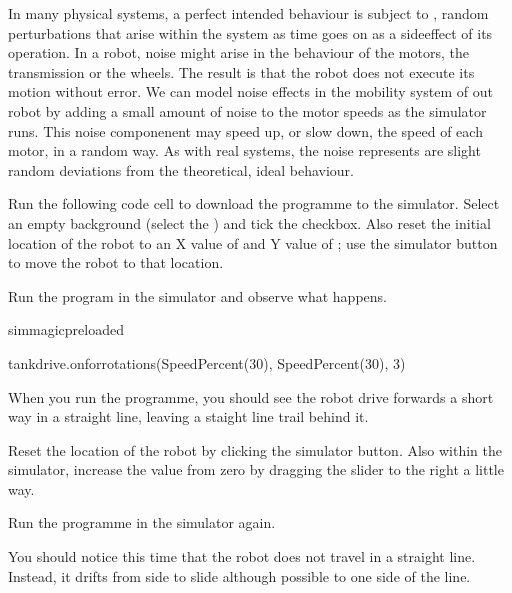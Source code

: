 \documentclass[letterpaper,10pt,english]{sphinxmanual}
\begin{document}
{In many physical systems, a perfect intended behaviour is subject to , random perturbations that arise within the system as time goes on as a side\sphinxhyphen{}effect of its operation. In a robot, noise might arise in the behaviour of the motors, the transmission or the wheels. The result is that the robot does not execute its motion without error. We can model noise effects in the mobility system of out robot by adding a small amount of noise to the motor speeds as the simulator runs. This noise
componenent may speed up, or slow down, the speed of each motor, in a random way. As with real systems, the noise represents are slight random deviations from the theoretical, ideal behaviour.

Run the following code cell to download the programme to the simulator. Select an empty background (select the ) and tick the  checkbox. Also reset the initial location of the robot to an X value of  and Y value of ; use the simulator  button to move the robot to that location.

Run the program in the simulator and observe what happens.

{
\begin{sphinxVerbatim}[commandchars=\\\{\}]
\llap{\color{nbsphinxin}[ ]:\,\hspace{\fboxrule}\hspace{\fboxsep}}\PYGZpc{}\PYGZpc{}sim\PYGZus{}magic\PYGZus{}preloaded

tank\PYGZus{}drive.on\PYGZus{}for\PYGZus{}rotations(SpeedPercent(30), SpeedPercent(30), 3)
\end{sphinxVerbatim}
}

When you run the programme, you should see the robot drive forwards a short way in a straight line, leaving a staight line trail behind it.

Reset the location of the robot by clicking the simulator  button. Also within the simulator, increase the  value from zero by dragging the slider to the right a little way.

Run the programme in the simulator again.

You should notice this time that the robot does not travel in a straight line. Instead, it drifts from side to slide although possible to one side of the line.

}
\end{document}
